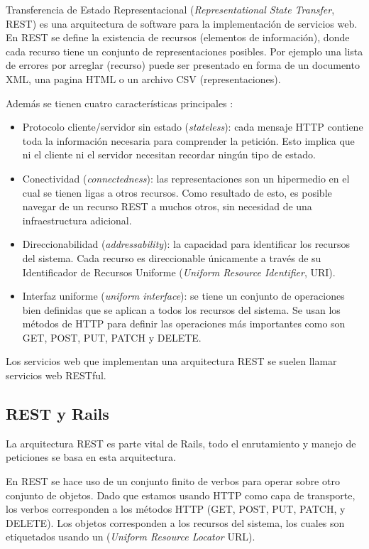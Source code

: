 Transferencia de Estado Representacional (\textit{Representational State Transfer}, REST) es una arquitectura de software para la implementación de servicios web.
En REST se define la existencia de recursos (elementos de información), donde
cada recurso tiene un conjunto de representaciones posibles.
Por ejemplo una lista de errores por arreglar (recurso) puede ser presentado en
forma de un documento XML, una pagina HTML o un archivo CSV (representaciones).

\vspace{2.5mm}

Además se tienen cuatro características principales \cite{1_richardson_2007}:

\begin{itemize}
\item Protocolo cliente/servidor sin estado (\textit{stateless}): cada mensaje
  HTTP contiene toda la información necesaria para comprender la petición.
  Esto implica que ni el cliente ni el servidor necesitan recordar ningún
  tipo de estado.
\item Conectividad (\textit{connectedness}): las representaciones son un hipermedio
  en el cual se tienen ligas a otros recursos. Como resultado de esto, es posible
  navegar de un recurso REST a muchos otros, sin necesidad de una
  infraestructura adicional.
\item Direccionabilidad (\textit{addressability}): la capacidad para
  identificar los recursos del sistema. Cada recurso es direccionable únicamente
  a través de su Identificador de Recursos Uniforme (\textit{Uniform Resource Identifier}, URI).
\item Interfaz uniforme (\textit{uniform interface}): se tiene un conjunto de
  operaciones bien definidas que se aplican a todos los recursos del sistema.
  Se usan los métodos de HTTP para definir las operaciones más importantes
  como son GET, POST, PUT, PATCH y DELETE.
\end{itemize}

Los servicios web que implementan una arquitectura REST se suelen llamar
servicios web RESTful.

\subsection{REST y Rails}

La arquitectura REST es parte vital de Rails, todo el enrutamiento y
manejo de peticiones se basa en esta arquitectura.

En REST se hace uso de un conjunto finito de verbos para operar sobre otro
conjunto de objetos. Dado que estamos usando HTTP como capa de transporte, los
verbos corresponden a los métodos HTTP (GET, POST, PUT, PATCH, y DELETE).
Los objetos corresponden a los recursos del sistema, los cuales son etiquetados
usando un (\textit{Uniform Resource Locator} URL).


